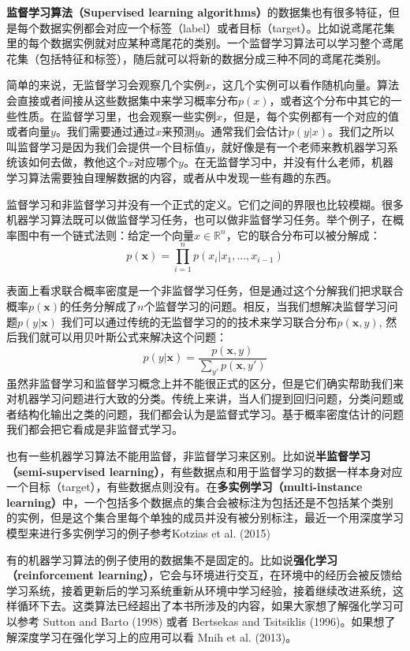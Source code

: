 \textbf{监督学习算法（Supervised learning algorithms）}的数据集也有很多特征，但是每个数据实例都会对应一个标签（label）或者目标（target）。比如说鸢尾花集里的每个数据实例就对应某种鸢尾花的类别。一个监督学习算法可以学习整个鸢尾花集（包括特征和标签），随后就可以将新的数据分成三种不同的鸢尾花类别。

简单的来说，无监督学习会观察几个实例$x$，这几个实例可以看作随机向量。算法会直接或者间接从这些数据集中来学习概率分布$p(x)$，或者这个分布中其它的一些性质。在监督学习里，也会观察一些实例$x$，但是，每个实例都有一个对应的值或者向量$y$。我们需要通过通过$x$来预测$y$。通常我们会估计$p(y|x)$。我们之所以叫监督学习是因为我们会提供一个目标值$y$，就好像是有一个老师来教机器学习系统该如何去做，教他这个$x$对应哪个$y$。在无监督学习中，并没有什么老师，机器学习算法需要独自理解数据的内容，或者从中发现一些有趣的东西。

监督学习和非监督学习并没有一个正式的定义。它们之间的界限也比较模糊。很多机器学习算法既可以做监督学习任务，也可以做非监督学习任务。举个例子，在概率图中有一个链式法则：给定一个向量$x\in \mathbb{R}^{n}$，它的联合分布可以被分解成：
\begin{equation}
    p(\textbf{x})=\prod_{i=1}^{n}p(x_i|x_1,...,x_{i-1})
\end{equation}

表面上看求联合概率密度是一个非监督学习任务，但是通过这个分解我们把求联合概率$p(\textbf{x})$的任务分解成了$n$个监督学习的问题。相反，当我们想解决监督学习问题$p(y|\textbf{x})$ 我们可以通过传统的无监督学习的的技术来学习联合分布$p(\textbf{x},y)$, 然后我们就可以用贝叶斯公式来解决这个问题：
\begin{equation}
    p(y|\textbf{x})=\frac{p(\textbf{x},y)}{\sum_{y'}p(\textbf{x},y')}
\end{equation}
虽然非监督学习和监督学习概念上并不能很正式的区分，但是它们确实帮助我们来对机器学习问题进行大致的分类。传统上来讲，当人们提到回归问题，分类问题或者结构化输出之类的问题，我们都会认为是监督式学习。基于概率密度估计的问题我们都会把它看成是非监督式学习。

也有一些机器学习算法不能用监督，非监督学习来区别。比如说\textbf{半监督学习（semi-supervised learning）}，有些数据点和用于监督学习的数据一样本身对应一个目标（target），有些数据点则没有。在\textbf{多实例学习（multi-instance learning）}中，一个包括多个数据点的集合会被标注为包括还是不包括某个类别的实例，但是这个集合里每个单独的成员并没有被分别标注，最近一个用深度学习模型来进行多实例学习的例子参考Kotzias et al. (2015)

有的机器学习算法的例子使用的数据集不是固定的。比如说\textbf{强化学习（reinforcement learning）}，它会与环境进行交互，在环境中的经历会被反馈给学习系统，接着更新后的学习系统重新从环境中学习经验，接着继续改进系统，这样循环下去。这类算法已经超出了本书所涉及的内容，如果大家想了解强化学习可以参考 Sutton and Barto (1998) 或者 Bertsekas and Tsitsiklis (1996)。如果想了解深度学习在强化学习上的应用可以看 Mnih et al. (2013)。

